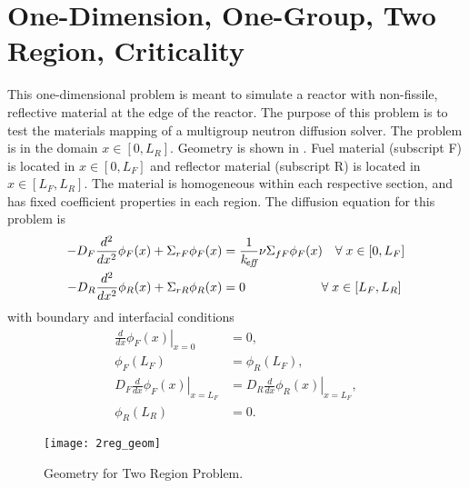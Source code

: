 \section{One-Dimension, One-Group, Two Region, Criticality}
  \label{sec:deriv_2reg}
  This one-dimensional problem is meant to simulate a reactor with non-fissile,
  reflective material at the edge of the reactor. The purpose of this problem is
  to test the materials mapping of a multigroup neutron diffusion solver. The
  problem is in the domain $x \in [0,L_R]$. Geometry is shown in
  . Fuel material (subscript F) is located in $x \in
  [0,L_F]$ and reflector material (subscript R) is located in $ x \in
  [L_F,L_R]$. The material is homogeneous within each respective section, and
  has fixed coefficient properties in each region.  The diffusion equation for
  this problem is 
  \begin{align}
    \label{eq:2regF}
    -D_F \frac{d^2}{dx^2} \phi_F(x) + \Sigma_{rF} \phi_F(x) &= \frac{1}{k_{\!\mbox{\scriptsize \em eff}}} 
      \nu \Sigma_{fF} \phi_F(x) \quad \forall \; x \in [0,L_F] \\
    \label{eq:2regR}
    -D_R \frac{d^2}{dx^2} \phi_R(x) + \Sigma_{rR} \phi_R(x) &= 0  
      \qquad \qquad \qquad \forall \; x \in [L_F,L_R]
  \end{align}
  with boundary and interfacial conditions
  \begin{align}
    \label{eq:2reg_bc0}
    \left. \frac{d}{dx} \phi_F(x) \right|_{x=0} &= 0, \\
    \label{eq:2reg_flux_continuity}
    \phi_F(L_F) &= \phi_R(L_F) ,\\
    \label{eq:2reg_current_continuity}
    D_F \left. \frac{d}{dx} \phi_F(x) \right|_{x=L_F} &= 
      D_R \left. \frac{d}{dx} \phi_R(x) \right|_{x=L_F} ,\\
    \label{eq:2reg_bcLR}
    \phi_R(L_R) &= 0.
  \end{align}
  \begin{figure}
    \centering
    \texttt{[image: 2reg\_geom]}
    \caption{Geometry for Two Region Problem.}
    \label{fig:2reg_geom}
  \end{figure}

